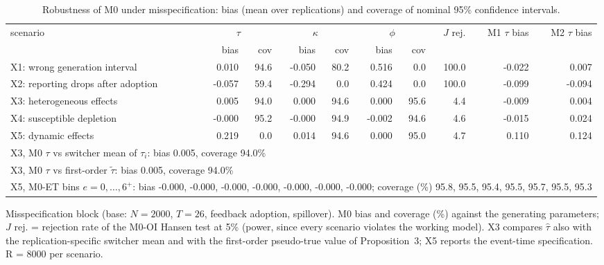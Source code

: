 \begin{table}[!t]
\centering
\caption{Robustness of M0 under misspecification: bias (mean over replications) and coverage of nominal 95\% confidence intervals.}
\label{tab:sim-misspec}
\footnotesize
\setlength{\tabcolsep}{3.5pt}
\begin{adjustbox}{max width=\linewidth}
\begin{tabular}{lrrrrrrrrr}
\toprule
scenario & \multicolumn{2}{c}{$\tau$} & \multicolumn{2}{c}{$\kappa$} & \multicolumn{2}{c}{$\phi$} & $J$ rej. & M1 $\tau$ bias & M2 $\tau$ bias \\
\cmidrule(lr){2-3}\cmidrule(lr){4-5}\cmidrule(lr){6-7}
 & bias & cov & bias & cov & bias & cov & & & \\
\midrule
X1: wrong generation interval & 0.010 & 94.6 & -0.050 & 80.2 & 0.516 & 0.0 & 100.0 & -0.022 & 0.007 \\
X2: reporting drops after adoption & -0.057 & 59.4 & -0.294 & 0.0 & 0.424 & 0.0 & 100.0 & -0.099 & -0.094 \\
X3: heterogeneous effects & 0.005 & 94.0 & 0.000 & 94.6 & 0.000 & 95.6 & 4.4 & -0.009 & 0.004 \\
X4: susceptible depletion & -0.000 & 95.2 & -0.000 & 94.9 & -0.002 & 94.6 & 4.6 & -0.015 & 0.024 \\
X5: dynamic effects & 0.219 & 0.0 & 0.014 & 94.6 & 0.000 & 95.0 & 4.7 & 0.110 & 0.124 \\
\midrule
\multicolumn{10}{l}{X3, M0 $\tau$ vs switcher mean of $\tau_i$: bias 0.005, coverage 94.0\%} \\
\multicolumn{10}{l}{X3, M0 $\tau$ vs first-order $\tilde\tau$: bias 0.005, coverage 94.0\%} \\
\multicolumn{10}{l}{X5, M0-ET bins $e=0,\dots,6^{+}$: bias -0.000, -0.000, -0.000, -0.000, -0.000, -0.000, -0.000; coverage (\%) 95.8, 95.5, 95.4, 95.5, 95.7, 95.5, 95.3} \\
\bottomrule
\end{tabular}
\end{adjustbox}
\par\smallskip\parbox{\linewidth}{\scriptsize Misspecification block (base: $N=2000$, $T=26$, feedback adoption, spillover). M0 bias and coverage (\%) against the generating parameters; $J$ rej. = rejection rate of the M0-OI Hansen test at 5\% (power, since every scenario violates the working model). X3 compares $\hat\tau$ also with the replication-specific switcher mean and with the first-order pseudo-true value of Proposition~3; X5 reports the event-time specification. R = 8000 per scenario.}
\end{table}
